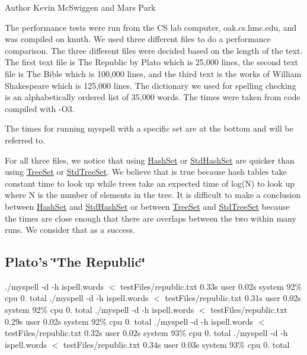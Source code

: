 \begin{DoxyAuthor}{Author}
Kevin Mc\-Swiggen and Mars Park
\end{DoxyAuthor}
The performance tests were run from the C\-S lab computer, oak.\-cs.\-hmc.\-edu, and was compiled on knuth. We used three different files to do a performance comparison. The three different files were decided based on the length of the text. The first text file is The Republic by Plato which is 25,000 lines, the second text file is The Bible which is 100,000 lines, and the third text is the works of William Shakespeare which is 125,000 lines. The dictionary we used for spelling checking is an alphabetically ordered list of 35,000 words. The times were taken from code compiled with -\/\-O3.

The times for running myspell with a specific set are at the bottom and will be referred to.

For all three files, we notice that using \hyperlink{class_hash_set}{Hash\-Set} or \hyperlink{class_std_hash_set}{Std\-Hash\-Set} are quicker than using \hyperlink{class_tree_set}{Tree\-Set} or \hyperlink{class_std_tree_set}{Std\-Tree\-Set}. We believe that is true because hash tables take constant time to look up while trees take an expected time of log(\-N) to look up where N is the number of elements in the tree. It is difficult to make a conclusion between \hyperlink{class_hash_set}{Hash\-Set} and \hyperlink{class_std_hash_set}{Std\-Hash\-Set} or between \hyperlink{class_tree_set}{Tree\-Set} and \hyperlink{class_std_tree_set}{Std\-Tree\-Set} because the times are close enough that there are overlaps between the two within many runs. We consider that as a success.



 \subsection*{Plato's \char`\"{}\-The Republic\char`\"{} }

./myspell -\/d -\/h ispell.\-words $<$ test\-Files/republic.\-txt 0.\-33s user 0.\-02s system 92\% cpu 0. total ./myspell -\/d -\/h ispell.\-words $<$ test\-Files/republic.\-txt 0.\-31s user 0.\-02s system 92\% cpu 0. total ./myspell -\/d -\/h ispell.\-words $<$ test\-Files/republic.\-txt 0.\-29s user 0.\-02s system 92\% cpu 0. total ./myspell -\/d -\/h ispell.\-words $<$ test\-Files/republic.\-txt 0.\-32s user 0.\-02s system 93\% cpu 0. total ./myspell -\/d -\/h ispell.\-words $<$ test\-Files/republic.\-txt 0.\-34s user 0.\-03s system 93\% cpu 0. total

